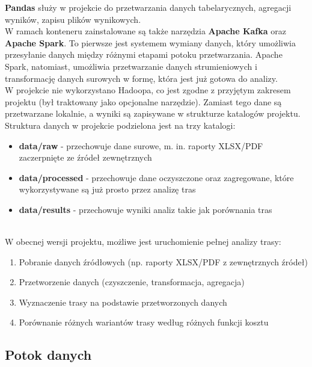 \documentclass[12pt]{article}
\begin{document}
\noindent \textbf{Pandas} służy w projekcie do przetwarzania danych tabelarycznych, agregacji wyników, zapisu plików wynikowych.\\

\noindent W ramach konteneru zainstalowane są także narzędzia \textbf{Apache Kafka} oraz \textbf{Apache Spark}. To pierwsze jest systemem wymiany danych, który umożliwia przesyłanie danych między różnymi etapami potoku przetwarzania. Apache Spark, natomiast, umożliwia przetwarzanie danych strumieniowych i transformację danych surowych w formę, która jest już gotowa do analizy.\\

\noindent W projekcie nie wykorzystano Hadoopa, co jest zgodne z przyjętym zakresem projektu (był traktowany jako opcjonalne narzędzie). Zamiast tego dane są przetwarzane lokalnie, a wyniki są zapisywane w strukturze katalogów projektu.\\

\noindent Struktura danych w projekcie podzielona jest na trzy katalogi:
\begin{itemize}
    \item \textbf{data/raw} - przechowuje dane surowe, m. in. raporty XLSX/PDF zaczerpnięte ze źródeł zewnętrznych
    \item \textbf{data/processed} - przechowuje dane oczyszczone oraz zagregowane, które wykorzystywane są już prosto przez analizę tras
    \item \textbf{data/results} - przechowuje wyniki analiz takie jak porównania tras
\end{itemize}

\noindent \\W obecnej wersji projektu, możliwe jest uruchomienie pełnej analizy trasy:
\begin{enumerate}
    \item Pobranie danych źródłowych (np. raporty XLSX/PDF z zewnętrznych źródeł)
    \item Przetworzenie danych (czyszczenie, transformacja, agregacja)
    \item Wyznaczenie trasy na podstawie przetworzonych danych
    \item Porównanie różnych wariantów trasy według różnych funkcji kosztu
\end{enumerate}

\subsection{Potok danych}
\end{document}
